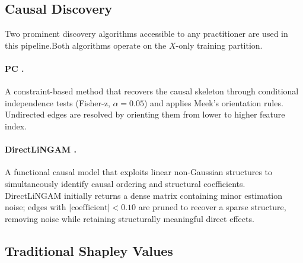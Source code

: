 \documentclass[12pt,letterpaper,twocolumn]{article}
\begin{document}
\subsection{Causal Discovery}

Two prominent discovery algorithms accessible to any practitioner are used in this
pipeline.Both algorithms operate on the $X$-only training partition.

\paragraph{PC \citep{Spirtes2000}.} A constraint-based method that recovers the causal
skeleton through conditional independence tests (Fisher-z, $\alpha = 0.05$) and applies
Meek's orientation rules. Undirected edges are resolved by orienting them from lower to
higher feature index.

\paragraph{DirectLiNGAM \citep{Shimizu2011}.} A functional causal model that exploits
linear non-Gaussian structures to simultaneously identify causal ordering and structural
coefficients. DirectLiNGAM initially returns a dense matrix containing minor estimation
noise; edges with $|\text{coefficient}| < 0.10$ are pruned to recover a sparse structure,
removing noise while retaining structurally meaningful direct effects.

\subsection{Traditional Shapley Values}
\end{document}
